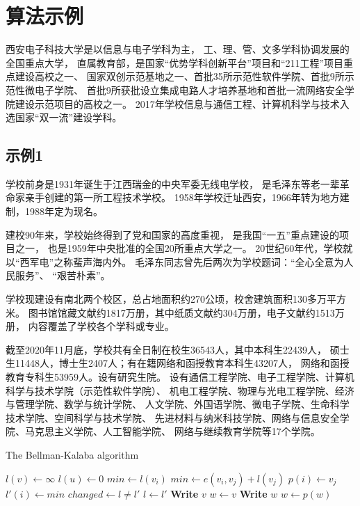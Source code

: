 \chapter{算法示例}
西安电子科技大学是以信息与电子学科为主，
工、理、管、文多学科协调发展的全国重点大学，
直属教育部，是国家“优势学科创新平台”项目和“211工程”项目重点建设高校之一、
国家双创示范基地之一、首批35所示范性软件学院、首批9所示范性微电子学院、
首批9所获批设立集成电路人才培养基地和首批一流网络安全学院建设示范项目的高校之一。
2017年学校信息与通信工程、计算机科学与技术入选国家“双一流”建设学科。
\section{示例1}
学校前身是1931年诞生于江西瑞金的中央军委无线电学校，
是毛泽东等老一辈革命家亲手创建的第一所工程技术学校。
1958年学校迁址西安，1966年转为地方建制，1988年定为现名。
\par
建校90年来，学校始终得到了党和国家的高度重视，
是我国“一五”重点建设的项目之一，
也是1959年中央批准的全国20所重点大学之一。
20世纪60年代，学校就以“西军电”之称蜚声海内外。
毛泽东同志曾先后两次为学校题词：“全心全意为人民服务”、
“艰苦朴素”。
\par
学校现建设有南北两个校区，总占地面积约270公顷，校舍建筑面积130多万平方米。
图书馆馆藏文献约1817万册，其中纸质文献约304万册，电子文献约1513万册，
内容覆盖了学校各个学科或专业。
\par
截至2020年11月底，学校共有全日制在校生36543人，其中本科生22439人，
硕士生11448人，博士生2407人；有在籍网络和函授教育本科生43207人，
网络和函授教育专科生53959人。设有研究生院。
设有通信工程学院、电子工程学院、计算机科学与技术学院（示范性软件学院）、
机电工程学院、物理与光电工程学院、经济与管理学院、数学与统计学院、
人文学院、外国语学院、微电子学院、生命科学技术学院、空间科学与技术学院、
先进材料与纳米科技学院、网络与信息安全学院、马克思主义学院、人工智能学院、
网络与继续教育学院等17个学院。
\begin{algorithm}
\caption{The Bellman-Kalaba algorithm}
\begin{algorithmic}[1]
\State $l(v) \leftarrow \infty$
\EndFor
\State $l(u) \leftarrow 0$
\Repeat
{}
\State $min \leftarrow l(v_i)$
\State $min \leftarrow e(v_i, v_j) + l(v_j)$
\State $p(i) \leftarrow v_j$
\EndIf
\EndFor
\State $l'(i) \leftarrow min$
\EndFor
\State $changed \leftarrow l \not= l'$
\State $l \leftarrow l'$
\EndProcedure
\Statex
{}
\State \textbf{Write} $v$
\Else
\State $w \leftarrow v$
\State \textbf{Write} $w$
\State $w \leftarrow p(w)$
\EndWhile
\EndIf
\EndProcedure
\end{algorithmic}
\end{algorithm}
